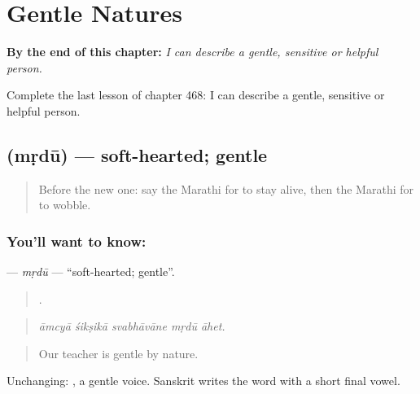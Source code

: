 
\chapter{Gentle Natures}
\label{ch:mr-gentle-natures}

\begin{chapteropening}
\textbf{By the end of this chapter:} \emph{I can describe a gentle, sensitive or helpful person.}

Complete the last lesson of chapter 468: I can describe a gentle, sensitive or helpful person.
\end{chapteropening}

\section[\texorpdfstring{\mr{मृदू} (mṛdū)}{मृदू (mṛdū)}]{ (mṛdū) — soft-hearted; gentle}

\label{lesson:MR-C468-mrdu}



\begin{quote}
Before the new one: say the Marathi for to stay alive, then the Marathi for to wobble.
\end{quote}

\subsection*{You'll want to know: }
\textbf{} — \emph{mṛdū} — \textquotedblleft{}soft-hearted; gentle\textquotedblright{}.

\begin{quote}
    .
\end{quote}

\begin{quote}
\emph{āmcyā śikṣikā svabhāvāne mṛdū āhet.}
\end{quote}

\begin{quote}
Our teacher is gentle by nature.
\end{quote}

Unchanging:  , a gentle voice. Sanskrit writes the word with a short final vowel.

